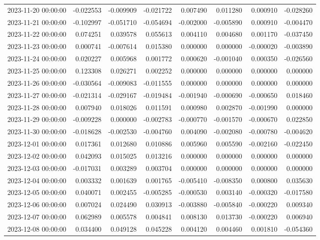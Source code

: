 \begin{tabular}{lrrrrrrr}
2023-11-20 00:00:00 & -0.022553 & -0.009909 & -0.021722 & 0.007490 & 0.011280 & 0.000910 & -0.028260 \\
2023-11-21 00:00:00 & -0.102997 & -0.051710 & -0.054694 & -0.002000 & -0.005890 & 0.000910 & -0.004470 \\
2023-11-22 00:00:00 & 0.074251 & 0.039578 & 0.055613 & 0.004110 & 0.004680 & 0.001170 & -0.037450 \\
2023-11-23 00:00:00 & 0.000741 & -0.007614 & 0.015380 & 0.000000 & 0.000000 & -0.000020 & -0.003890 \\
2023-11-24 00:00:00 & 0.020227 & 0.005968 & 0.001772 & 0.000620 & -0.001040 & 0.000350 & -0.026560 \\
2023-11-25 00:00:00 & 0.123308 & 0.026271 & 0.002252 & 0.000000 & 0.000000 & 0.000000 & 0.000000 \\
2023-11-26 00:00:00 & -0.030564 & -0.009083 & -0.011555 & 0.000000 & 0.000000 & 0.000000 & 0.000000 \\
2023-11-27 00:00:00 & -0.021314 & -0.029167 & -0.019484 & -0.001940 & -0.000690 & -0.000650 & 0.018460 \\
2023-11-28 00:00:00 & 0.007940 & 0.018026 & 0.011591 & 0.000980 & 0.002870 & -0.001990 & 0.000000 \\
2023-11-29 00:00:00 & -0.009228 & 0.000000 & -0.002783 & -0.000770 & -0.001570 & -0.000670 & 0.022850 \\
2023-11-30 00:00:00 & -0.018628 & -0.002530 & -0.004760 & 0.004090 & -0.002080 & -0.000780 & -0.004620 \\
2023-12-01 00:00:00 & 0.017361 & 0.012680 & 0.010886 & 0.005960 & 0.005590 & -0.002160 & -0.022450 \\
2023-12-02 00:00:00 & 0.042093 & 0.015025 & 0.013216 & 0.000000 & 0.000000 & 0.000000 & 0.000000 \\
2023-12-03 00:00:00 & -0.017031 & 0.003289 & 0.003704 & 0.000000 & 0.000000 & 0.000000 & 0.000000 \\
2023-12-04 00:00:00 & 0.003332 & 0.001639 & 0.001765 & -0.005410 & -0.008350 & 0.000800 & 0.035630 \\
2023-12-05 00:00:00 & 0.040071 & 0.002455 & -0.005285 & -0.000530 & 0.003140 & -0.000320 & -0.017580 \\
2023-12-06 00:00:00 & 0.007024 & 0.024490 & 0.030913 & -0.003880 & -0.005840 & -0.000220 & 0.009340 \\
2023-12-07 00:00:00 & 0.062989 & 0.005578 & 0.004841 & 0.008130 & 0.013730 & -0.000220 & 0.006940 \\
2023-12-08 00:00:00 & 0.034400 & 0.049128 & 0.045228 & 0.004120 & 0.004460 & 0.001810 & -0.054360 \\

\end{tabular}
